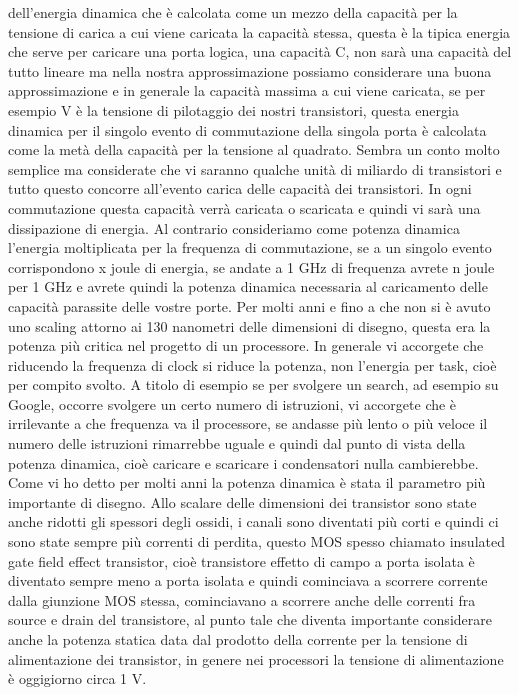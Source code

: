 dell'energia dinamica che è calcolata come un mezzo della capacità per la tensione di carica a cui viene caricata la capacità stessa, questa è la tipica energia che serve per caricare una porta logica, una capacità C, non sarà una capacità del tutto lineare ma nella nostra approssimazione possiamo considerare una buona approssimazione e in generale la capacità massima a cui viene caricata, se per esempio V è la tensione di pilotaggio dei nostri transistori, questa energia dinamica per il singolo evento di commutazione della singola porta è calcolata come la metà della capacità per la tensione al quadrato.
Sembra un conto molto semplice ma considerate che vi saranno qualche unità di miliardo di transistori e tutto questo concorre all'evento carica delle capacità dei transistori.
In ogni commutazione questa capacità verrà caricata o scaricata e quindi vi sarà una dissipazione di energia.
Al contrario consideriamo come potenza dinamica l'energia moltiplicata per la frequenza di commutazione, se a un singolo evento corrispondono x joule di energia, se andate a 1 GHz di frequenza avrete n joule per 1 GHz e avrete quindi la potenza dinamica necessaria al caricamento delle capacità parassite delle vostre porte. Per molti anni e fino a che non si è avuto uno scaling attorno ai 130 nanometri delle dimensioni di disegno, questa era la potenza più critica nel progetto di un processore.
In generale vi accorgete che riducendo la frequenza di clock si riduce la potenza, non l'energia per task, cioè per compito svolto.
A titolo di esempio se per svolgere un search, ad esempio su Google, occorre svolgere un certo numero di istruzioni, vi accorgete che è irrilevante a che frequenza va il processore, se andasse più lento o più veloce il numero delle istruzioni rimarrebbe uguale e quindi dal punto di vista della potenza dinamica, cioè caricare e scaricare i condensatori nulla cambierebbe.
Come vi ho detto per molti anni la potenza dinamica è stata il parametro più importante di disegno.
Allo scalare delle dimensioni dei transistor sono state anche ridotti gli spessori degli ossidi, i canali sono diventati più corti e quindi ci sono state sempre più correnti di perdita, questo MOS spesso chiamato insulated gate field effect transistor, cioè transistore effetto di campo a porta isolata è diventato sempre meno a porta isolata e quindi cominciava a scorrere corrente dalla giunzione MOS stessa, cominciavano a scorrere anche delle correnti fra source e drain del transistore, al punto tale che diventa importante considerare anche la potenza statica data dal prodotto della corrente per la tensione di alimentazione dei transistor, in genere nei processori la tensione di alimentazione è oggigiorno circa 1 V.
